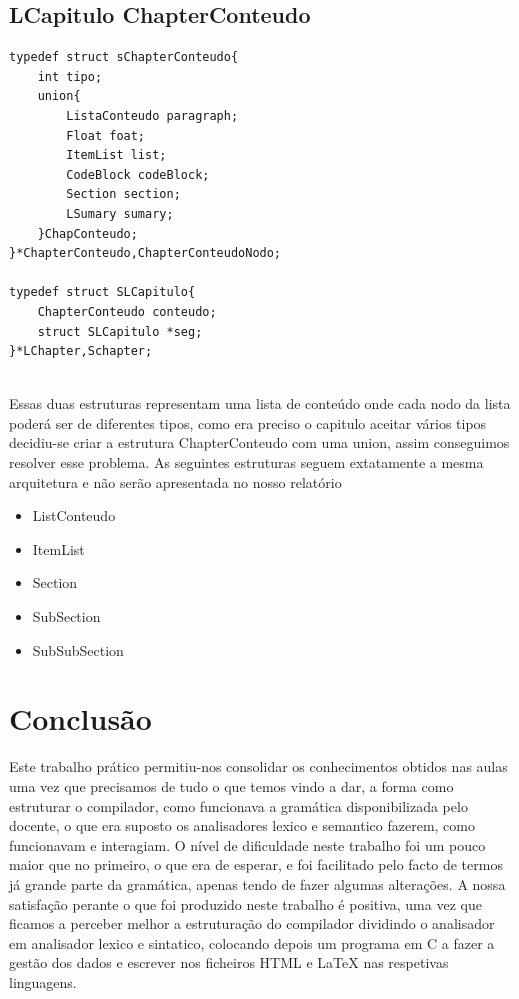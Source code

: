 \documentclass[12pt,a4paper]{report}
\begin{document}
\section{LCapitulo ChapterConteudo }
\begin{verbatim}
typedef struct sChapterConteudo{
    int tipo;
    union{
        ListaConteudo paragraph;
        Float foat;
        ItemList list;
        CodeBlock codeBlock;
        Section section;
        LSumary sumary;
    }ChapConteudo;
}*ChapterConteudo,ChapterConteudoNodo;

typedef struct SLCapitulo{
    ChapterConteudo conteudo;
    struct SLCapitulo *seg;
}*LChapter,Schapter; 
 
\end{verbatim}Essas duas estruturas representam uma lista de conteúdo onde cada nodo da lista poderá ser de diferentes tipos, como era preciso o capitulo aceitar vários tipos decidiu-se criar a estrutura ChapterConteudo com uma union, assim conseguimos resolver esse problema.       
As seguintes estruturas seguem extatamente a mesma arquitetura e não serão apresentada no nosso relatório
\begin{itemize}\item ListConteudo  \item ItemList  \item Section \item SubSection  \item SubSubSection  \end{itemize}\chapter{Conclusão}
Este trabalho prático permitiu-nos consolidar os conhecimentos obtidos nas aulas uma vez que precisamos de tudo o que temos vindo a dar, a forma como estruturar o compilador, como funcionava a gramática disponibilizada pelo docente, o que era suposto os analisadores lexico e semantico fazerem, como funcionavam e interagiam. O nível de dificuldade neste trabalho foi um pouco maior que no primeiro, o que era de esperar, e foi facilitado pelo facto de termos já grande parte da gramática, apenas tendo de fazer algumas alterações. A nossa satisfação perante o que foi produzido neste trabalho é positiva, uma vez que ficamos a perceber melhor a estruturação do compilador dividindo o analisador em analisador lexico e sintatico, colocando depois um programa em C a fazer a gestão dos dados e escrever nos ficheiros HTML e LaTeX nas respetivas linguagens. 
\end{document}
